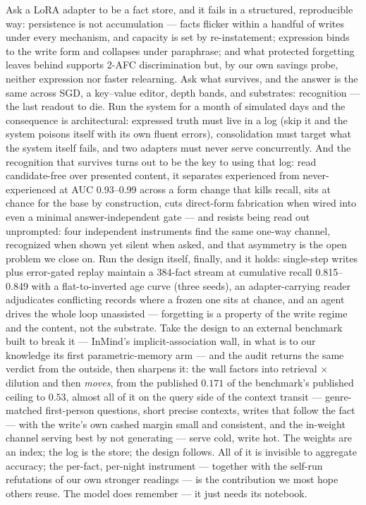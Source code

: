 \documentclass[11pt]{article}
\begin{document}
Ask a LoRA adapter to be a fact store, and it fails in a structured, reproducible way:
persistence is not accumulation --- facts flicker within a handful of writes under every
mechanism, and capacity is set by re-instatement; expression binds to the write form and
collapses under paraphrase; and what protected forgetting leaves behind supports 2-AFC
discrimination but, by our own savings probe, neither expression nor faster relearning. Ask what
survives, and the answer is the same across SGD, a key--value editor, depth bands, and
substrates: recognition --- the last readout to die. Run the system for a month of simulated
days and the consequence is architectural: expressed truth must live in a log (skip it and the
system poisons itself with its own fluent errors), consolidation must target what the system
itself fails, and two adapters must never serve concurrently. And the recognition that survives turns
out to be the key to using that log: read candidate-free over presented content, it separates
experienced from never-experienced at AUC 0.93--0.99 across a form change that kills recall,
sits at chance for the base by construction, cuts direct-form fabrication when wired into even a minimal
answer-independent gate --- and resists being read out unprompted: four independent instruments
find the same one-way channel, recognized when shown yet silent when asked, and that asymmetry
is the open problem we
close on. Run the design itself, finally, and it holds: single-step writes plus error-gated
replay maintain a 384-fact stream at cumulative recall 0.815--0.849 with a flat-to-inverted age curve
(three seeds), an adapter-carrying reader adjudicates conflicting records where a frozen one
sits at chance, and an agent drives the whole loop unassisted --- forgetting is a property of
the write regime and the content, not the substrate. Take the design to an external
benchmark built to break
it --- InMind's implicit-association wall, in what is to our knowledge its first
parametric-memory arm --- and the audit returns the same verdict from the outside, then
sharpens it: the wall factors into retrieval $\times$ dilution and then \emph{moves}, from
the published $0.171$ of the benchmark's published ceiling to $0.53$, almost all of it on
the query side of the
context transit --- genre-matched first-person questions, short precise contexts, writes
that follow the fact --- with the write's own cashed margin small and consistent, and the
in-weight channel serving best by not generating --- serve cold, write hot.
The weights are an index; the log is the store; the design follows. All of it is
invisible to aggregate accuracy; the per-fact, per-night instrument --- together with the
self-run refutations of our own stronger readings --- is the contribution we most hope others
reuse. The model does remember --- it just needs its notebook.
\end{document}
